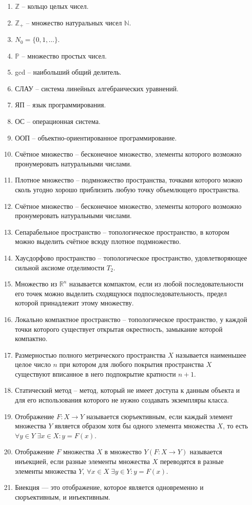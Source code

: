 \documentclass[master, och, diploma, times]{sty/SCWorks}
\theoremstyle{plain}
\theoremstyle{definition}
\numberwithin{equation}{section}
\begin{document}
\begin{enumerate}
	\item $\mathbb {Z}$ -- кольцо целых чисел.
	\item $\mathbb {Z}_{+}$ -- множество натуральных чисел $\mathbb {N}$.
	\item ${N}_0=\{0,1,\dots\}$.
	\item $\mathbb {P}$ -- множество простых чисел.
	\item gcd -- наибольший общий делитель.
	\item СЛАУ -- система линейных алгебраических уравнений.
	\item ЯП -- язык программирования.
	\item ОС -- операционная система.
	\item ООП -- объектно-ориентированное программирование.
	\item Счётное множество -- бесконечное множество, элементы которого возможно пронумеровать натуральными числами.
	\item Плотное множество -- подмножество пространства, точками которого можно сколь угодно хорошо приблизить любую точку объемлющего пространства.
	\item Счётное множество -- бесконечное множество, элементы которого возможно пронумеровать натуральными числами.
	\item Сепарабельное пространство -- топологическое пространство, в котором можно выделить счётное всюду плотное подмножество.
	\item Хаусдорфово пространство -- топологическое пространство, удовлетворяющее сильной аксиоме отделимости $T_2$.
	\item Множество из $\mathbb {R}^n$ называется компактом, если из любой последовательности его точек можно выделить сходящуюся подпоследовательность, предел которой принадлежит этому множеству.
	\item Локально компактное пространство -- топологическое пространство, у каждой точки которого существует открытая окрестность, замыкание которой компактно.
	\item Размерностью полного метрического пространства $X$ называется наименьшее целое число $n$ при котором для любого покрытия пространства $X$ существуют вписанное в него подпокрытие кратности $n+1$.
	\item Статический метод -- метод, который не имеет доступа к данным объекта и для его использования которого не нужно создавать экземпляры класса.
	\item Отображение $F:X \to Y$ называется сюръективным, если каждый элемент множества $Y$ является образом хотя бы одного элемента множества $X$, то есть $\forall y \in Y \; \exists x \in X : y=F(x)$.
	\item Отображение $F$ множества $X$ в множество $Y(F: X \to Y)$ называется инъекцией, если разные элементы множества $X$ переводятся в разные элементы множества $Y$, $\forall x \in X \; \exists y \in Y : y=F(x)$.
	\item Биекция — это отображение, которое является одновременно и сюръективным, и инъективным\cite{bib:number:tyapaev}.
\end{enumerate}
\end{document}
